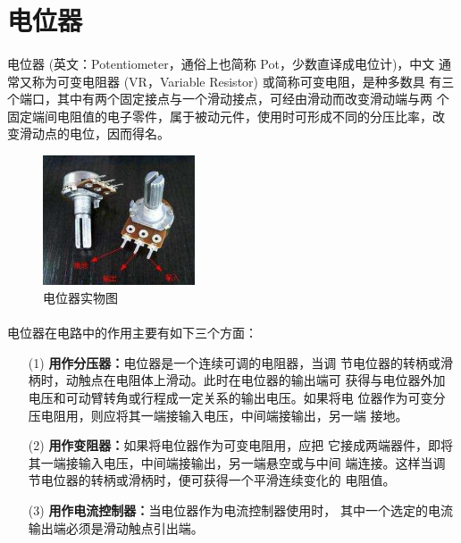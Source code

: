 \documentclass[UTF8, oneside]{ctexbook}
\begin{document}
\section{电位器}

\paragraph{}
电位器 (英文：Potentiometer，通俗上也简称 Pot，少数直译成电位计)，中文
通常又称为可变电阻器 (VR，Variable Resistor) 或简称可变电阻，是种多数具
有三个端口，其中有两个固定接点与一个滑动接点，可经由滑动而改变滑动端与两
个固定端间电阻值的电子零件，属于被动元件，使用时可形成不同的分压比率，改
变滑动点的电位，因而得名。

\begin{figure}[h]
    \centering
    \includegraphics[width=0.4\textwidth]{./result/basic/7/pot.png}
    \caption{电位器实物图}
    \label{pot}
\end{figure}

\paragraph{}
电位器在电路中的作用主要有如下三个方面：
\begin{itemize}
    \item[(1)] \textbf{用作分压器：}电位器是一个连续可调的电阻器，当调
    节电位器的转柄或滑柄时，动触点在电阻体上滑动。此时在电位器的输出端可
    获得与电位器外加电压和可动臂转角或行程成一定关系的输出电压。如果将电
    位器作为可变分压电阻用，则应将其一端接输入电压，中间端接输出，另一端
    接地。

    \item[(2)] \textbf{用作变阻器：}如果将电位器作为可变电阻用，应把
    它接成两端器件，即将其一端接输入电压，中间端接输出，另一端悬空或与中间
    端连接。这样当调节电位器的转柄或滑柄时，便可获得一个平滑连续变化的
    电阻值。

    \item[(3)] \textbf{用作电流控制器：}当电位器作为电流控制器使用时，
    其中一个选定的电流输出端必须是滑动触点引出端。
\end{itemize}
\end{document}
